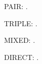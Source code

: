 \documentclass[thesis,humanities,no-doi]{yibinthesis}
\begin{document}
\nocite{k1,k2,k3,k4,k5,k6,k7,k8}
PAIR: .

TRIPLE: .

MIXED: .

DIRECT: \cite{k7,k8}.
\printyibinbibliography
\end{document}

